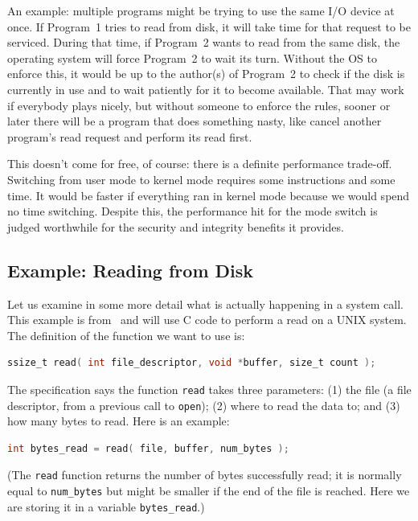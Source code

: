 An example: multiple programs might be trying to use the same I/O device at once. If Program~1 tries to read from disk, it will take time for that request to be serviced. During that time, if Program~2 wants to read from the same disk, the operating system will force Program~2 to wait its turn. Without the OS to enforce this, it would be up to the author(s) of Program~2 to check if the disk is currently in use and to wait patiently for it to become available. That may work if everybody plays nicely, but without someone to enforce the rules, sooner or later there will be a program that does something nasty, like cancel another program's read request and perform its read first.

This doesn't come for free, of course: there is a definite performance trade-off. Switching from user mode to kernel mode requires some instructions and some time. It would be faster if everything ran in kernel mode because we would spend no time switching. Despite this, the performance hit for the mode switch is judged worthwhile for the security and integrity benefits it provides.

\subsection*{Example: Reading from Disk}
Let us examine in some more detail what is actually happening in a
system call. This example is from~\cite{mos} and will use C code to
perform a read on a UNIX system. The definition of the function we want to use is:

\begin{lstlisting}[language=C]
ssize_t read( int file_descriptor, void *buffer, size_t count );
\end{lstlisting}

The specification says the function
\texttt{read} takes three parameters: (1) the file (a file
descriptor, from a previous call to \texttt{open}); (2) where to read
the data to; and (3) how many bytes to read. Here is an example:

\begin{lstlisting}[language=C]
int bytes_read = read( file, buffer, num_bytes );
\end{lstlisting}

(The \texttt{read} function returns the number of bytes successfully read; it is normally equal to \texttt{num\_bytes} but might be smaller if the end of the file is reached. Here we are storing it in a variable \texttt{bytes\_read}.)

